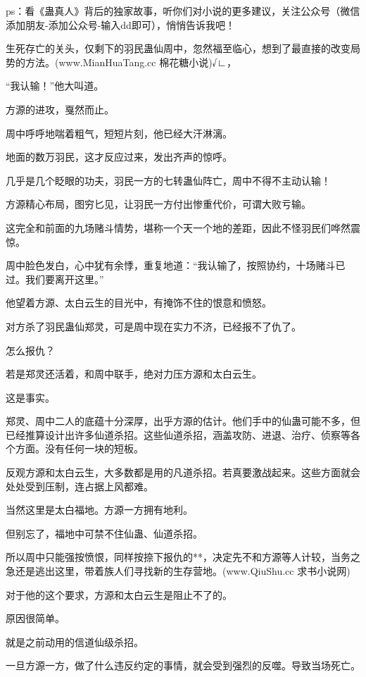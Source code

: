 
\begin{this_body}

ps：看《蛊真人》背后的独家故事，听你们对小说的更多建议，关注公众号（微信添加朋友-添加公众号-输入dd即可），悄悄告诉我吧！

生死存亡的关头，仅剩下的羽民蛊仙周中，忽然福至临心，想到了最直接的改变局势的方法。(www.MianHuaTang.cc 棉花糖小说)√∟，

“我认输！”他大叫道。

方源的进攻，戛然而止。

周中呼呼地喘着粗气，短短片刻，他已经大汗淋漓。

地面的数万羽民，这才反应过来，发出齐声的惊呼。

几乎是几个眨眼的功夫，羽民一方的七转蛊仙阵亡，周中不得不主动认输！

方源精心布局，图穷匕见，让羽民一方付出惨重代价，可谓大败亏输。

这完全和前面的九场赌斗情势，堪称一个天一个地的差距，因此不怪羽民们哗然震惊。

周中脸色发白，心中犹有余悸，重复地道：“我认输了，按照协约，十场赌斗已过。我们要离开这里。”

他望着方源、太白云生的目光中，有掩饰不住的恨意和愤怒。

对方杀了羽民蛊仙郑灵，可是周中现在实力不济，已经报不了仇了。

怎么报仇？

若是郑灵还活着，和周中联手，绝对力压方源和太白云生。

这是事实。

郑灵、周中二人的底蕴十分深厚，出乎方源的估计。他们手中的仙蛊可能不多，但已经推算设计出许多仙道杀招。这些仙道杀招，涵盖攻防、进退、治疗、侦察等各个方面。没有任何一块的短板。

反观方源和太白云生，大多数都是用的凡道杀招。若真要激战起来。这些方面就会处处受到压制，连占据上风都难。

当然这里是太白福地。方源一方拥有地利。

但别忘了，福地中可禁不住仙蛊、仙道杀招。

所以周中只能强按愤恨，同样按捺下报仇的**，决定先不和方源等人计较，当务之急还是逃出这里，带着族人们寻找新的生存营地。(www.QiuShu.cc 求书小说网)

对于他的这个要求，方源和太白云生是阻止不了的。

原因很简单。

就是之前动用的信道仙级杀招。

一旦方源一方，做了什么违反约定的事情，就会受到强烈的反噬。导致当场死亡。


\end{this_body}
